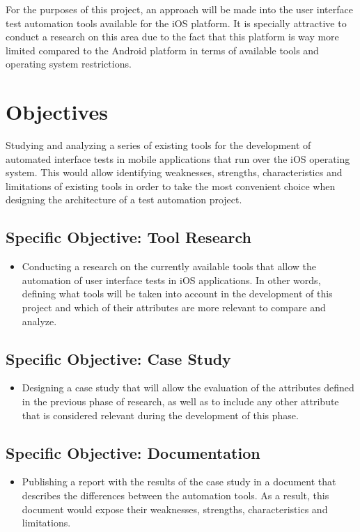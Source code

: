 For the purposes of this project, an approach will be made into the user interface test automation tools available for the iOS platform. It is specially attractive to conduct a research on this area due to the fact that this platform is way more limited compared to the Android platform in terms of available tools and operating system restrictions.

\section{Objectives}
Studying and analyzing a series of existing tools for the development of automated interface tests in mobile applications that run over the iOS operating system. This would allow identifying weaknesses, strengths, characteristics and limitations of existing tools in order to take the most convenient choice when designing the architecture of a test automation project.

\subsection{Specific Objective: Tool Research}
\begin{itemize}
	\item Conducting a research on the currently available tools that allow the automation of user interface tests in iOS applications. In other words, defining what tools will be taken into account in the development of this project and which of their attributes are more relevant to compare and analyze.
\end{itemize}
\subsection{Specific Objective: Case Study}
\begin{itemize}
	\item Designing a case study that will allow the evaluation of the attributes defined in the previous phase of research, as well as to include any other attribute that is considered relevant during the development of this phase.
\end{itemize}
\subsection{Specific Objective: Documentation}
\begin{itemize}
	\item Publishing a report with the results of the case study in a document that describes the differences between the automation tools. As a result, this document would expose their weaknesses, strengths, characteristics and limitations.
\end{itemize}

